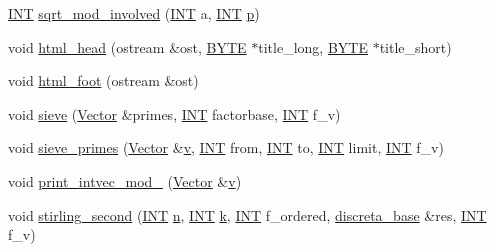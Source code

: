 \begin{DoxyCompactItemize}
\item 
\mbox{\hyperlink{galois_8h_a09fddde158a3a20bd2dcadb609de11dc}{I\+NT}} \mbox{\hyperlink{global_8_c_acd861d9b44d7703f6f8bf7fd75b9afe6}{sqrt\+\_\+mod\+\_\+involved}} (\mbox{\hyperlink{galois_8h_a09fddde158a3a20bd2dcadb609de11dc}{I\+NT}} a, \mbox{\hyperlink{galois_8h_a09fddde158a3a20bd2dcadb609de11dc}{I\+NT}} \mbox{\hyperlink{alphabet2_8_c_a533391314665d6bf1b5575e9a9cd8552}{p}})
\item 
void \mbox{\hyperlink{global_8_c_ab45d69fb36af020e7aa845c02d6ae874}{html\+\_\+head}} (ostream \&ost, \mbox{\hyperlink{galois_8h_ab6cc7b4aeb6ea31aba2b3fbfc83ff5e6}{B\+Y\+TE}} $\ast$title\+\_\+long, \mbox{\hyperlink{galois_8h_ab6cc7b4aeb6ea31aba2b3fbfc83ff5e6}{B\+Y\+TE}} $\ast$title\+\_\+short)
\item 
void \mbox{\hyperlink{global_8_c_a79f71595a9a2cc6beeab971365da4a7c}{html\+\_\+foot}} (ostream \&ost)
\item 
void \mbox{\hyperlink{global_8_c_a345c446e2e34a78955592030508a3bdb}{sieve}} (\mbox{\hyperlink{class_vector}{Vector}} \&primes, \mbox{\hyperlink{galois_8h_a09fddde158a3a20bd2dcadb609de11dc}{I\+NT}} factorbase, \mbox{\hyperlink{galois_8h_a09fddde158a3a20bd2dcadb609de11dc}{I\+NT}} f\+\_\+v)
\item 
void \mbox{\hyperlink{global_8_c_aee0955bf933f6d61c37e426a4254e1bd}{sieve\+\_\+primes}} (\mbox{\hyperlink{class_vector}{Vector}} \&\mbox{\hyperlink{simeon_8_c_aeb3f3030944801b163bc3b829a7f6710}{v}}, \mbox{\hyperlink{galois_8h_a09fddde158a3a20bd2dcadb609de11dc}{I\+NT}} from, \mbox{\hyperlink{galois_8h_a09fddde158a3a20bd2dcadb609de11dc}{I\+NT}} to, \mbox{\hyperlink{galois_8h_a09fddde158a3a20bd2dcadb609de11dc}{I\+NT}} limit, \mbox{\hyperlink{galois_8h_a09fddde158a3a20bd2dcadb609de11dc}{I\+NT}} f\+\_\+v)
\item 
void \mbox{\hyperlink{global_8_c_ae17c26bafae8d998ec75a721feede289}{print\+\_\+intvec\+\_\+mod\+\_}} (\mbox{\hyperlink{class_vector}{Vector}} \&\mbox{\hyperlink{simeon_8_c_aeb3f3030944801b163bc3b829a7f6710}{v}})
\item 
void \mbox{\hyperlink{global_8_c_a97414d48b4630aa231d26a78ae3158af}{stirling\+\_\+second}} (\mbox{\hyperlink{galois_8h_a09fddde158a3a20bd2dcadb609de11dc}{I\+NT}} \mbox{\hyperlink{simeon_8_c_a7f2cd26777ce0ff3fdaf8d02aacbddfb}{n}}, \mbox{\hyperlink{galois_8h_a09fddde158a3a20bd2dcadb609de11dc}{I\+NT}} \mbox{\hyperlink{simeon_8_c_a43fa990200c3ddd47c35f151bd4d66bf}{k}}, \mbox{\hyperlink{galois_8h_a09fddde158a3a20bd2dcadb609de11dc}{I\+NT}} f\+\_\+ordered, \mbox{\hyperlink{classdiscreta__base}{discreta\+\_\+base}} \&res, \mbox{\hyperlink{galois_8h_a09fddde158a3a20bd2dcadb609de11dc}{I\+NT}} f\+\_\+v)

\end{DoxyCompactItemize}
